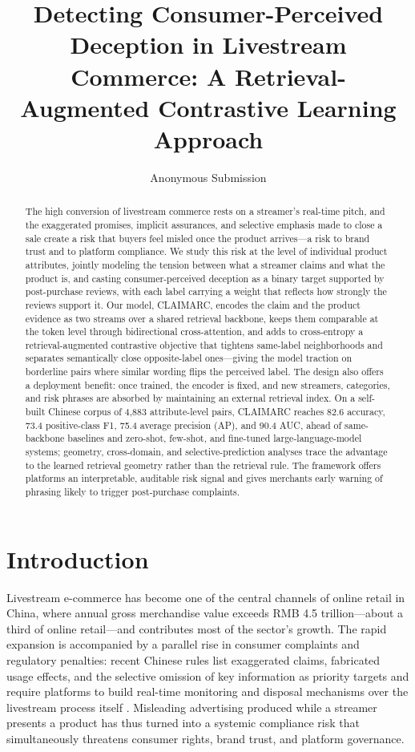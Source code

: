 \documentclass[letterpaper]{article}
\title{Detecting Consumer-Perceived Deception in Livestream Commerce: A Retrieval-Augmented Contrastive Learning Approach}
\author{Anonymous Submission}
\begin{document}
\maketitle

\begin{abstract}
The high conversion of livestream commerce rests on a streamer's real-time pitch, and the exaggerated promises, implicit assurances, and selective emphasis made to close a sale create a risk that buyers feel misled once the product arrives---a risk to brand trust and to platform compliance. We study this risk at the level of individual product attributes, jointly modeling the tension between what a streamer claims and what the product is, and casting consumer-perceived deception as a binary target supported by post-purchase reviews, with each label carrying a weight that reflects how strongly the reviews support it. Our model, CLAIMARC, encodes the claim and the product evidence as two streams over a shared retrieval backbone, keeps them comparable at the token level through bidirectional cross-attention, and adds to cross-entropy a retrieval-augmented contrastive objective that tightens same-label neighborhoods and separates semantically close opposite-label ones---giving the model traction on borderline pairs where similar wording flips the perceived label. The design also offers a deployment benefit: once trained, the encoder is fixed, and new streamers, categories, and risk phrases are absorbed by maintaining an external retrieval index. On a self-built Chinese corpus of 4{,}883 attribute-level pairs, CLAIMARC reaches 82.6 accuracy, 73.4 positive-class F1, 75.4 average precision (AP), and 90.4 AUC, ahead of same-backbone baselines and zero-shot, few-shot, and fine-tuned large-language-model systems; geometry, cross-domain, and selective-prediction analyses trace the advantage to the learned retrieval geometry rather than the retrieval rule. The framework offers platforms an interpretable, auditable risk signal and gives merchants early warning of phrasing likely to trigger post-purchase complaints.
\end{abstract}

\section{Introduction}

Livestream e-commerce has become one of the central channels of online retail in China, where annual gross merchandise value exceeds RMB 4.5 trillion---about a third of online retail---and contributes most of the sector's growth. The rapid expansion is accompanied by a parallel rise in consumer complaints and regulatory penalties: recent Chinese rules list exaggerated claims, fabricated usage effects, and the selective omission of key information as priority targets and require platforms to build real-time monitoring and disposal mechanisms over the livestream process itself \citep{samr2025livestream}. Misleading advertising produced while a streamer presents a product has thus turned into a systemic compliance risk that simultaneously threatens consumer rights, brand trust, and platform governance.
\end{document}
